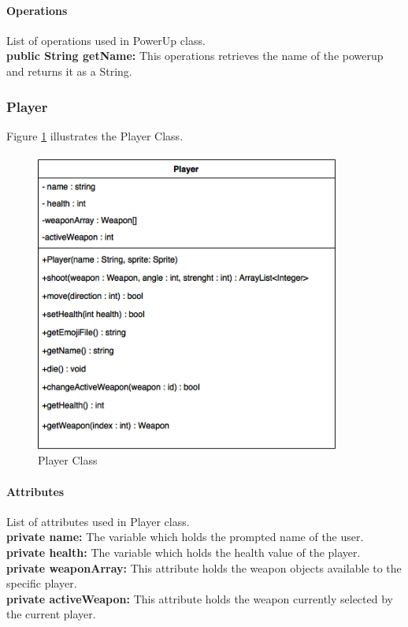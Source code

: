 \documentclass[12pt]{article} %
\begin{document}
\paragraph{Operations \\}
List of operations used in PowerUp class.\\
\textbf{public String getName:} This operations retrieves the name of the powerup and returns it as a String.




\subsubsection{Player} %

Figure \ref{fig:player} illustrates the Player Class.
\begin{figure}[h!]
   \centering
   \vspace{10pt}%
   \includegraphics[width=10cm]{player.png}
   \caption{Player Class}
   \label{fig:player}
\end{figure}

\paragraph{Attributes\\}

List of attributes used in Player class.\\
\textbf{private name:} The variable which holds the prompted name of the user.\\
\textbf{private health:} The variable which holds the health value of the player.\\
\textbf{private weaponArray:} This attribute holds the weapon objects available to the specific player.\\
\textbf{private activeWeapon:} This attribute holds the weapon currently selected by the current player.
\end{document}
